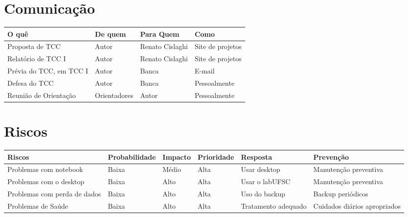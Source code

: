 \documentclass[12pt]{article}
\begin{document}
\newpage
\section{Comunicação}
    \begin{tabular}{l l l l}
        \hline
        O quê  & De quem & Para Quem & Como \\
        \hline
        Proposta de TCC         & Autor     & Renato Cislaghi   & Site de projetos \\
        Relatório de TCC I      & Autor     & Renato Cislaghi   & Site de projetos \\
        Prévia do TCC, em TCC I & Autor     & Banca             & E-mail \\
        Defesa do TCC           & Autor     & Banca             & Pessoalmente \\
        Reunião de Orientação   & Orientadores  & Autor         & Pessoalmente \\
        \hline
    \end{tabular}

\newpage
\section{Riscos}
    \begin{tabular}{|p{2.5cm}|p{2.5cm}|p{2.5cm}|p{2.5cm}|p{2.5cm}|p{2.5cm}|}
        \hline
        Riscos                       & Probabilidade & Impacto & Prioridade & Resposta           & Prevenção                     \\
        \hline
        \hline
        Problemas com notebook       & Baixa         & Médio   & Alta       & Usar desktop        & Manutenção preventiva        \\
        \hline
        Problemas com o desktop      & Baixa         & Alto    & Alta       & Usar o labUFSC      & Manutenção preventiva        \\
        \hline
        Problemas com perda de dados & Baixa         & Alto    & Alta       & Uso do backup       & Backup periódicos            \\
        \hline
        Problemas de Saúde           & Baixa         & Alto    & Alta       & Tratamento adequado & Cuidados diários apropriados \\
        \hline
    \end{tabular}
\newpage



\end{document}
